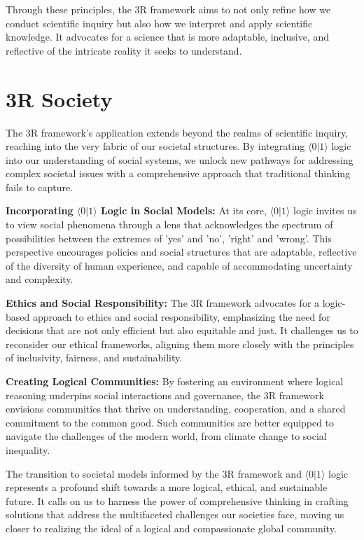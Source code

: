 \documentclass[12pt]{article}
\newcommand{\qbit}{\ensuremath{\langle 0 | 1 \rangle}}
\begin{document}
Through these principles, the 3R framework aims to not only refine how we conduct scientific inquiry but also how we interpret and apply scientific knowledge. It advocates for a science that is more adaptable, inclusive, and reflective of the intricate reality it seeks to understand.

\section*{3R Society}

The 3R framework’s application extends beyond the realms of scientific inquiry, reaching into the very fabric of our societal structures. By integrating \qbit{} logic into our understanding of social systems, we unlock new pathways for addressing complex societal issues with a comprehensive approach that traditional thinking fails to capture.

\textbf{Incorporating \qbit{} Logic in Social Models:} At its core, \qbit{} logic invites us to view social phenomena through a lens that acknowledges the spectrum of possibilities between the extremes of 'yes' and 'no', 'right' and 'wrong'. This perspective encourages policies and social structures that are adaptable, reflective of the diversity of human experience, and capable of accommodating uncertainty and complexity.

\textbf{Ethics and Social Responsibility:} The 3R framework advocates for a logic-based approach to ethics and social responsibility, emphasizing the need for decisions that are not only efficient but also equitable and just. It challenges us to reconsider our ethical frameworks, aligning them more closely with the principles of inclusivity, fairness, and sustainability.

\textbf{Creating Logical Communities:} By fostering an environment where logical reasoning underpins social interactions and governance, the 3R framework envisions communities that thrive on understanding, cooperation, and a shared commitment to the common good. Such communities are better equipped to navigate the challenges of the modern world, from climate change to social inequality.

The transition to societal models informed by the 3R framework and \qbit{} logic represents a profound shift towards a more logical, ethical, and sustainable future. It calls on us to harness the power of comprehensive thinking in crafting solutions that address the multifaceted challenges our societies face, moving us closer to realizing the ideal of a logical and compassionate global community.
\end{document}
